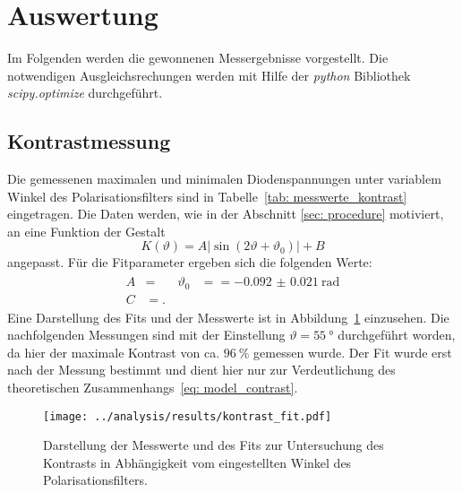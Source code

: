 \newpage
\section{Auswertung}
Im Folgenden werden die gewonnenen Messergebnisse vorgestellt. Die notwendigen Ausgleichsrechungen werden 
mit Hilfe der \emph{python} Bibliothek \emph{scipy.optimize} durchgeführt.

\subsection{Kontrastmessung}
Die gemessenen maximalen und minimalen Diodenspannungen unter variablem Winkel des Polarisationsfilters sind in 
Tabelle~\ref{tab: messwerte_kontrast} eingetragen.
Die Daten werden, wie in der Abschnitt \ref{sec: procedure} motiviert, an eine Funktion der Gestalt
\begin{equation}
    K(\vartheta) = A \left|\sin \left(2 \vartheta + \vartheta_0 \right)\right| + B 
    \label{eq: model_contrast}
\end{equation}
angepasst. Für die Fitparameter ergeben sich die folgenden Werte:
\begin{align}
    \begin{aligned}
    A &=  \quad  & \vartheta_0 &=  = \SI{-0.092(21)}{\radian} \\ 
    C &= .
    \end{aligned}
\end{align}
Eine Darstellung des Fits und der Messwerte ist in Abbildung~\ref{fig: kontrast_fit} einzusehen.
Die nachfolgenden Messungen sind mit der Einstellung $\vartheta = \SI{55}{\degree}$ durchgeführt worden, da hier der maximale 
Kontrast von ca. $\SI{96}{\percent}$ gemessen wurde. Der Fit wurde erst nach der Messung bestimmt und dient hier nur 
zur Verdeutlichung des theoretischen Zusammenhangs~\eqref{eq: model_contrast}.



\begin{figure}
    \centering
    \texttt{[image: ../analysis/results/kontrast\_fit.pdf]}
    \caption{Darstellung der Messwerte und des Fits zur Untersuchung des Kontrasts in Abhängigkeit vom eingestellten Winkel des Polarisationsfilters.}
    \label{fig: kontrast_fit}
\end{figure}


